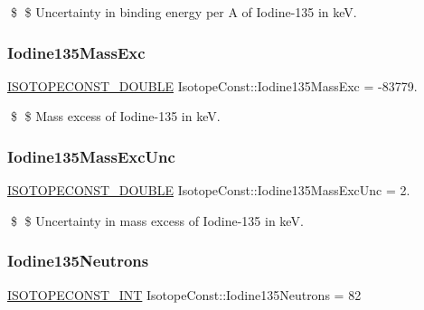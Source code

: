 \$ \$ Uncertainty in binding energy per A of Iodine-\/135 in keV. \mbox{\label{group___isotope_const-_iodine-_i135_ga95954d5a2b862b33b4bd77c8737212bd}} 
\subsubsection{\texorpdfstring{Iodine135\+Mass\+Exc}{Iodine135MassExc}}
{\footnotesize\ttfamily \mbox{\hyperlink{group___isotope_const-_macros_ga8f45a7272ce02c0b4c65c44636ed719a}{I\+S\+O\+T\+O\+P\+E\+C\+O\+N\+S\+T\+\_\+\+D\+O\+U\+B\+LE}} Isotope\+Const\+::\+Iodine135\+Mass\+Exc = -\/83779.}

\$ \$ Mass excess of Iodine-\/135 in keV. \mbox{\label{group___isotope_const-_iodine-_i135_ga4a2d5e96103c1ce22dde4dcf390b1efa}} 
\subsubsection{\texorpdfstring{Iodine135\+Mass\+Exc\+Unc}{Iodine135MassExcUnc}}
{\footnotesize\ttfamily \mbox{\hyperlink{group___isotope_const-_macros_ga8f45a7272ce02c0b4c65c44636ed719a}{I\+S\+O\+T\+O\+P\+E\+C\+O\+N\+S\+T\+\_\+\+D\+O\+U\+B\+LE}} Isotope\+Const\+::\+Iodine135\+Mass\+Exc\+Unc = 2.}

\$ \$ Uncertainty in mass excess of Iodine-\/135 in keV. \mbox{\label{group___isotope_const-_iodine-_i135_ga0f80428521e0b1d43b24ed61125e6463}} 
\subsubsection{\texorpdfstring{Iodine135\+Neutrons}{Iodine135Neutrons}}
{\footnotesize\ttfamily \mbox{\hyperlink{group___isotope_const-_macros_ga5f18360b3e99483a35c32d789e62621c}{I\+S\+O\+T\+O\+P\+E\+C\+O\+N\+S\+T\+\_\+\+I\+NT}} Isotope\+Const\+::\+Iodine135\+Neutrons = 82}

